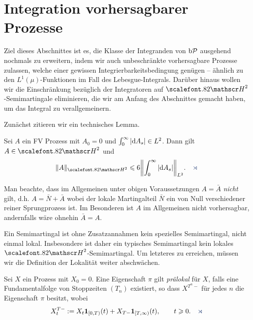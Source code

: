 \section{Integration vorhersagbarer Prozesse}

Ziel dieses Abschnittes ist es, die Klasse der Integranden von $\mathrm{b}\mathcal{P}$
ausgehend nochmals zu erweitern, indem wir auch unbeschränkte vorhersagbare
Prozesse zulassen, welche einer gewissen Integrierbarkeitsbedingung genügen --
ähnlich zu den $L^1(\mu)$-Funktionen im Fall des Lebesgue-Integrals. Darüber
hinaus wollen wir die Einschränkung bezüglich der Integratoren auf
$\HH^2$-Semimartingale eliminieren, die wir am Anfang des Abschnittes gemacht
haben, um das Integral zu verallgemeinern.

Zunächst zitieren wir ein technisches Lemma. 

\begin{lemma}
\label{lem:4.2}
Sei $A$ ein FV Prozess mit $A_0=0$ und $\int_0^\infty |\mathrm{d} A_s| \in L^2$.
Dann gilt $A \in \cH^2$ und 
\begin{align*}
\norm{A}_{\cH^2} \le 6 \norm*{\int_0^\infty |\dA_s|}_{L^2}.\fish
\end{align*}
\end{lemma}

Man beachte, dass im Allgemeinen unter obigen Voraussetzungen $A = \bar{A}$
\textit{nicht} gilt, d.h. $A = \bar{N} + \bar{A}$ wobei der lokale Martingalteil
$\bar{N}$ ein von Null verschiedener reiner Sprungprozess ist. Im Besonderen
ist $A$ im Allgemeinen nicht vorhersagbar, andernfalls wäre ohnehin $\bar{A} = A$.

Ein Semimartingal ist ohne Zusatzannahmen kein spezielles Semimartingal, nicht
einmal lokal. Insbesondere ist daher ein typisches Semimartingal kein lokales
$\HH^2$-Semimartingal. Um letzteres zu erreichen, müssen wir die Definition der
Lokalität weiter abschwächen.
% 

\begin{definition}
\label{defn:4.4}
Sei $X$ ein Prozess mit $X_0=0$. Eine Eigenschaft $\pi$ gilt \emph{prälokal}
für $X$, falls eine Fundamentalfolge von Stoppzeiten $(T_n)$ existiert, so dass
$X^{T^n-}$ für jedes $n$ die Eigenschaft $\pi$ besitzt, wobei
\begin{align*}
X_t^{T-}\defl X_t\Id_{[0,T)}(t) + X_{T-}\Id_{[T,\infty)}(t),\qquad t\ge 0.\fish
\end{align*}
\end{definition}

